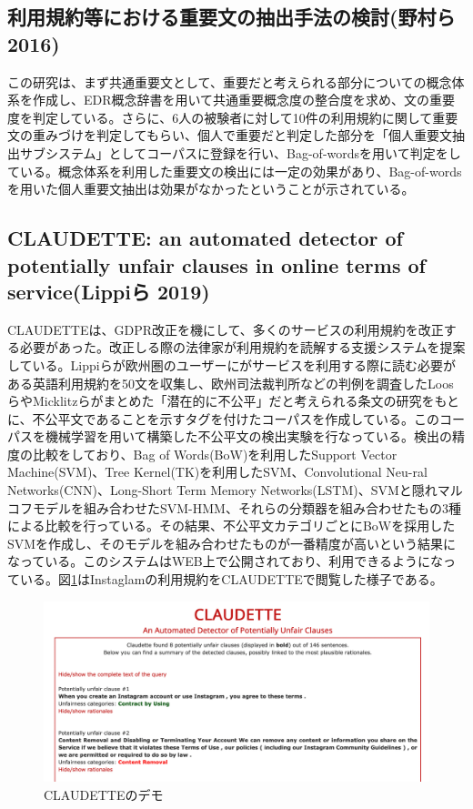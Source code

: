 \subsection{利用規約等における重要文の抽出手法の検討(野村ら 2016)}
この研究\cite{weko_162804_1}は、まず共通重要文として、重要だと考えられる部分についての概念体系を作成し、EDR概念辞書を用いて共通重要概念度の整合度を求め、文の重要度を判定している。さらに、6人の被験者に対して10件の利用規約に関して重要文の重みづけを判定してもらい、個人で重要だと判定した部分を「個人重要文抽出サブシステム」としてコーパスに登録を行い、Bag-of-words\cite{Zhang2010}を用いて判定をしている。概念体系を利用した重要文の検出には一定の効果があり、Bag-of-wordsを用いた個人重要文抽出は効果がなかったということが示されている。

\subsection{CLAUDETTE: an automated detector of potentially unfair clauses in online terms of service(Lippiら 2019)}
\label{sub:CLAUDETTE}
CLAUDETTE\cite{Lippi_2019}は、GDPR改正を機にして、多くのサービスの利用規約を改正する必要があった。改正しる際の法律家が利用規約を読解する支援システムを提案している。Lippiらが欧州圏のユーザーにがサービスを利用する際に読む必要がある英語利用規約を50文を収集し、欧州司法裁判所などの判例を調査したLoosら\cite{Loos_2015}やMicklitzら\cite{Micklitz_2017}がまとめた「潜在的に不公平」だと考えられる条文の研究をもとに、不公平文であることを示すタグを付けたコーパスを作成している。このコーパスを機械学習を用いて構築した不公平文の検出実験を行なっている。検出の精度の比較をしており、Bag of Words(BoW)を利用したSupport Vector Machine(SVM)\cite{Joachims_1998}、Tree Kernel(TK)\cite{Moschitti_2006}を利用したSVM、Convolutional Neu-ral Networks(CNN)\cite{arxiv.1408.5882}、Long-Short Term Memory Networks(LSTM)\cite{Graves_2005}、SVMと隠れマルコフモデルを組み合わせたSVM-HMM\cite{JMLR:v6:tsochantaridis05a}、それらの分類器を組み合わせたもの3種による比較を行っている。その結果、不公平文カテゴリごとにBoWを採用したSVMを作成し、そのモデルを組み合わせたものが一番精度が高いという結果になっている。このシステムはWEB上で公開されており、利用できるようになっている。図\ref{img:claudette}はInstaglamの利用規約をCLAUDETTEで閲覧した様子である。
\begin{figure}[h]
  \begin{center}
      \includegraphics[width=15cm]{img/claudette.png}
      \caption{CLAUDETTEのデモ}
      \label{img:claudette}
  \end{center}
\end{figure}

